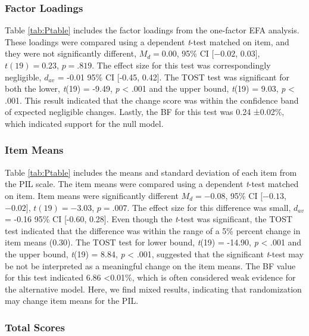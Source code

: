 \documentclass[english,man, mask]{apa6}
\theoremstyle{definition}
\theoremstyle{definition}
\theoremstyle{definition}
\theoremstyle{remark}
\begin{document}
\subsubsection{Factor Loadings}\label{factor-loadings}

Table \ref{tab:Ptable} includes the factor loadings from the one-factor
EFA analysis. These loadings were compared using a dependent
\emph{t}-test matched on item, and they were not significantly
different, \(M_d = 0.00\), 95\% CI \([-0.02\), \(0.03]\),
\(t(19) = 0.23\), \(p = .819\). The effect size for this test was
correspondingly negligible, \(d_{av}\) = -0.01 95\% CI {[}-0.45,
0.42{]}. The TOST test was significant for both the lower, \emph{t}(19)
= -9.49, \emph{p} \textless{} .001 and the upper bound, \emph{t}(19) =
9.03, \emph{p} \textless{} .001. This result indicated that the change
score was within the confidence band of expected negligible changes.
Lastly, the BF for this test was 0.24 ±0.02\%, which indicated support
for the null model.

\subsubsection{Item Means}\label{item-means}

Table \ref{tab:Ptable} includes the means and standard deviation of each
item from the PIL scale. The item means were compared using a dependent
\emph{t}-test matched on item. Item means were significantly different
\(M_d = -0.08\), 95\% CI \([-0.13\), \(-0.02]\), \(t(19) = -3.03\),
\(p = .007\). The effect size for this difference was small, \(d_{av}\)
= -0.16 95\% CI {[}-0.60, 0.28{]}. Even though the \emph{t}-test was
significant, the TOST test indicated that the difference was within the
range of a 5\% percent change in item means (0.30). The TOST test for
lower bound, \emph{t}(19) = -14.90, \emph{p} \textless{} .001 and the
upper bound, \emph{t}(19) = 8.84, \emph{p} \textless{} .001, suggested
that the significant \emph{t}-test may be not be interpreted as a
meaningful change on the item means. The BF value for this test
indicated 6.86 \textless{}0.01\%, which is often considered weak
evidence for the alternative model. Here, we find mixed results,
indicating that randomization may change item means for the PIL.

\subsubsection{Total Scores}\label{total-scores}
\end{document}
